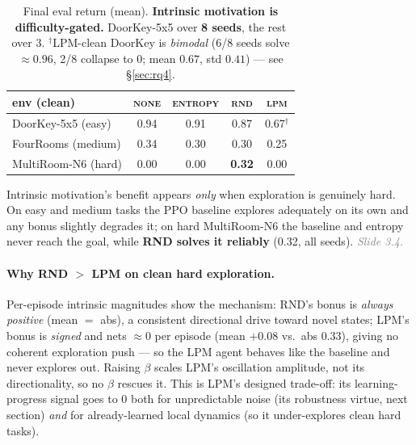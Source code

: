 \documentclass[11pt]{article}
\newcommand{\note}[1]{\textcolor{gray}{\small\emph{#1}}}
\begin{document}
\begin{table}[h]\centering
\begin{tabular}{lcccc}
\toprule
env (clean) & \textsc{none} & \textsc{entropy} & \textsc{rnd} & \textsc{lpm} \\
\midrule
DoorKey-5x5 (easy)   & 0.94 & 0.91 & 0.87 & 0.67$^\dagger$ \\
FourRooms (medium)   & 0.34 & 0.30 & 0.30 & 0.25 \\
MultiRoom-N6 (hard)  & 0.00 & 0.00 & \textbf{0.32} & 0.00 \\
\bottomrule
\end{tabular}
\caption{Final eval return (mean). \textbf{Intrinsic motivation is difficulty-gated.} DoorKey-5x5
over \textbf{8 seeds}, the rest over 3. $^\dagger$LPM-clean DoorKey is \emph{bimodal} (6/8 seeds solve
$\approx0.96$, 2/8 collapse to $0$; mean $0.67$, std $0.41$) --- see \S\ref{sec:rq4}.}
\label{tab:ladder}\end{table}

Intrinsic motivation's benefit appears \emph{only} when exploration is genuinely hard. On easy and
medium tasks the PPO baseline explores adequately on its own and any bonus slightly degrades it; on
hard MultiRoom-N6 the baseline and entropy never reach the goal, while \textbf{RND solves it reliably}
(0.32, all seeds). \note{Slide 3.4.}

\paragraph{Why RND $>$ LPM on clean hard exploration.} Per-episode intrinsic magnitudes show the
mechanism: RND's bonus is \emph{always positive} (mean $=$ abs), a consistent directional drive toward
novel states; LPM's bonus is \emph{signed} and nets $\approx 0$ per episode (mean $+0.08$ vs.\ abs
$0.33$), giving no coherent exploration push --- so the LPM agent behaves like the baseline and never
explores out. Raising $\beta$ scales LPM's oscillation amplitude, not its directionality, so no
$\beta$ rescues it. This is LPM's designed trade-off: its learning-progress signal goes to $0$ both
for unpredictable noise (its robustness virtue, next section) \emph{and} for already-learned local
dynamics (so it under-explores clean hard tasks).
\end{document}
